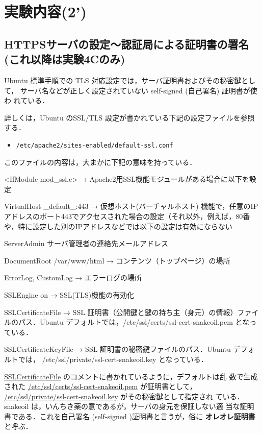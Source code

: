 \section{実験内容(2’)}

\subsection{HTTPSサーバの設定～認証局による証明書の署名 (これ以降は実験4Cのみ)}

Ubuntu 標準手順での TLS 対応設定では，サーバ証明書およびその秘密鍵として，
サーバ名などが正しく設定されていない self-signed (自己署名) 証明書が使わ
れている．


詳しくは，Ubuntu のSSL/TLS 設定が書かれている下記の設定ファイルを参照する．

\begin{itemize}
    \item \texttt{/etc/apache2/sites-enabled/default-ssl.conf}
\end{itemize}

このファイルの内容は，大まかに下記の意味を持っている．

\begin{cli}
<IfModule mod_ssl.c>
→ Apache2用SSL機能モジュールがある場合に以下を設定

VirtualHost _default_:443
→ 仮想ホスト(バーチャルホスト) 機能で，任意のIPアドレスのポート443でアクセスされた場合の設定（それ以外，例えば，80番や，特に設定した別のIPアドレスなどでは以下の設定は有効にならない

ServerAdmin サーバ管理者の連絡先メールアドレス

DocumentRoot /var/www/html
→ コンテンツ（トップページ）の場所

ErrorLog, CustomLog
→ エラーログの場所

SSLEngine on
→ SSL(TLS)機能の有効化

SSLCertificateFile
→ SSL 証明書（公開鍵と鍵の持ち主（身元）の情報）ファイルのパス．Ubuntu デフォルトでは，/etc/ssl/certs/ssl-cert-snakeoil.pem となっている．

SSLCertificateKeyFile
→ SSL 証明書の秘密鍵ファイルのパス．Ubuntu デフォルトでは，
/etc/ssl/private/ssl-cert-snakeoil.key となっている．

\end{cli}

\url{SSLCertificateFile} のコメントに書かれているように，デフォルトは乱
数で生成された \url{/etc/ssl/certs/ssl-cert-snakeoil.pem} が証明書として，
\url{/etc/ssl/private/ssl-cert-snakeoil.key} がその秘密鍵として指定され
ている．snakeoil は，いんちき薬の意であるが，サーバの身元を保証しない適
当な証明書である．これを自己署名 (self-signed )証明書と言うが，俗に
\textbf{オレオレ証明書}と呼ぶ．

